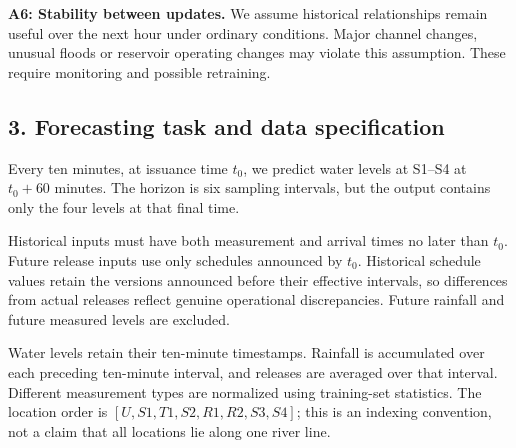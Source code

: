 \textbf{A6: Stability between updates.} We assume historical relationships remain useful over the next hour under ordinary conditions. Major channel changes, unusual floods or reservoir operating changes may violate this assumption. These require monitoring and possible retraining.

\subsection*{3. Forecasting task and data specification}
Every ten minutes, at issuance time $t_0$, we predict water levels at S1--S4 at $t_0+60$ minutes. The horizon is six sampling intervals, but the output contains only the four levels at that final time.

Historical inputs must have both measurement and arrival times no later than $t_0$. Future release inputs use only schedules announced by $t_0$. Historical schedule values retain the versions announced before their effective intervals, so differences from actual releases reflect genuine operational discrepancies. Future rainfall and future measured levels are excluded.

Water levels retain their ten-minute timestamps. Rainfall is accumulated over each preceding ten-minute interval, and releases are averaged over that interval. Different measurement types are normalized using training-set statistics. The location order is $[U,S1,T1,S2,R1,R2,S3,S4]$; this is an indexing convention, not a claim that all locations lie along one river line.

